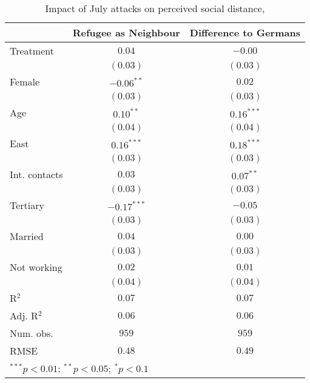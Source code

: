
\begin{table}
\caption{Impact of July attacks on perceived social distance, }
\begin{center}
\begin{tabular}{l c c}
\toprule
 & Refugee as Neighbour & Difference to Germans \\
\midrule
Treatment     & $0.04$        & $-0.00$      \\
              & $(0.03)$      & $(0.03)$     \\
Female        & $-0.06^{**}$  & $0.02$       \\
              & $(0.03)$      & $(0.03)$     \\
Age           & $0.10^{**}$   & $0.16^{***}$ \\
              & $(0.04)$      & $(0.04)$     \\
East          & $0.16^{***}$  & $0.18^{***}$ \\
              & $(0.03)$      & $(0.03)$     \\
Int. contacts & $0.03$        & $0.07^{**}$  \\
              & $(0.03)$      & $(0.03)$     \\
Tertiary      & $-0.17^{***}$ & $-0.05$      \\
              & $(0.03)$      & $(0.03)$     \\
Married       & $0.04$        & $0.00$       \\
              & $(0.03)$      & $(0.03)$     \\
Not working   & $0.02$        & $0.01$       \\
              & $(0.04)$      & $(0.04)$     \\
\midrule
R$^2$         & $0.07$        & $0.07$       \\
Adj. R$^2$    & $0.06$        & $0.06$       \\
Num. obs.     & $959$         & $959$        \\
RMSE          & $0.48$        & $0.49$       \\
\bottomrule
\multicolumn{3}{l}{\scriptsize{$^{***}p<0.01$; $^{**}p<0.05$; $^{*}p<0.1$}}
\end{tabular}
\label{tab_dist}
\end{center}
\end{table}
